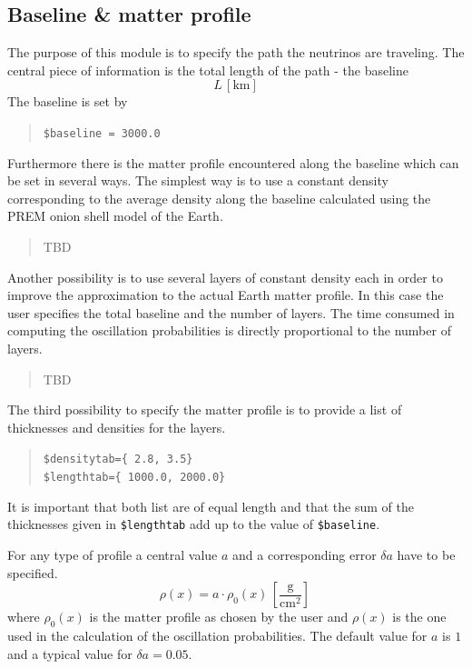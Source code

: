 \subsection{Baseline \& matter profile}
The purpose of this module is to specify the path the neutrinos
are traveling. The central piece of information is the total length
of the path - the baseline
\begin{equation}
L\,\left[\mathrm{km}\right]
\end{equation} 
The baseline is set by 
\begin{quote}
{\tt \$baseline = 3000.0 }
\end{quote}




Furthermore there is
the matter profile encountered along the baseline which can be set in
several ways. The simplest way is to use a constant density corresponding
to the average density along the baseline calculated using the 
PREM\cite{Stacey} onion shell model of the 
Earth.
\begin{quote}
TBD
\end{quote}


Another possibility is to use several layers of constant density each in 
order to improve the approximation to the actual Earth matter profile. In this
case the user specifies the total baseline and the number of layers. The
time consumed in computing the oscillation probabilities is directly 
proportional to the number of layers.
\begin{quote}
TBD
\end{quote}


The third possibility to specify the matter profile is to provide a list
of thicknesses and densities for the layers. 
\begin{quote}
{\tt \$densitytab=\{ 2.8, 3.5\}}\\
{\tt \$lengthtab=\{ 1000.0, 2000.0\}}\\
\end{quote}
It is important that both list are of equal length and that the sum
of the thicknesses given in  {\tt \$lengthtab} add up to the value of
{\tt \$baseline}.

For any type of profile a central value $a$ and a corresponding error 
$\delta a$ have to be specified.
\begin{equation}
\label{eq:density_error}
\rho(x)=a\cdot\rho_0(x)\,\left[\frac{\mathrm{g}}{\mathrm{cm}^2}\right]\,
\end{equation}
where $\rho_0(x)$ is the matter profile as chosen by the user and $\rho(x)$ is
the one used in the calculation of the oscillation probabilities. The default
value for $a$ is $1$ and a typical value for $\delta a = 0.05$. 


